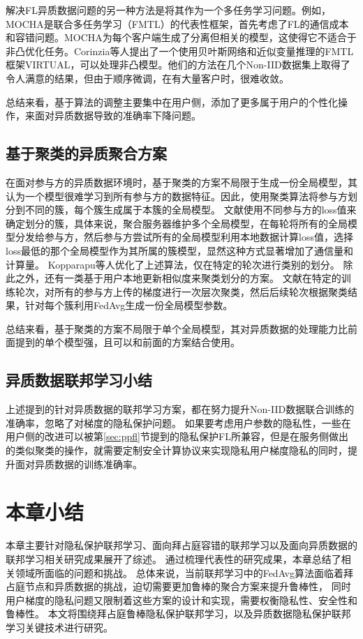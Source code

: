 解决FL异质数据问题的另一种方法是将其作为一个多任务学习问题。例如，MOCHA\cite{smith2017federated}是联合多任务学习（FMTL）的代表性框架，首先考虑了FL的通信成本和容错问题。MOCHA为每个客户端生成了分离但相关的模型，这使得它不适合于非凸优化任务。Corinzia等人\cite{corinzia2019variational}提出了一个使用贝叶斯网络和近似变量推理的FMTL框架VIRTUAL，可以处理非凸模型。他们的方法在几个Non-IID数据集上取得了令人满意的结果，但由于顺序微调，在有大量客户时，很难收敛。


总结来看，基于算法的调整主要集中在用户侧，添加了更多属于用户的个性化操作，来面对异质数据导致的准确率下降问题。

\subsection{基于聚类的异质聚合方案}
在面对参与方的异质数据环境时，基于聚类的方案不局限于生成一份全局模型，其认为一个模型很难学习到所有参与方的数据特征。因此，使用聚类算法将参与方划分到不同的簇，每个簇生成属于本簇的全局模型。
文献\cite{ghosh2022efficient}使用不同参与方的loss值来确定划分的簇，具体来说，聚合服务器维护多个全局模型，在每轮将所有的全局模型分发给参与方，然后参与方尝试所有的全局模型利用本地数据计算loss值，选择loss最低的那个全局模型作为其所属的簇模型，显然这种方式显著增加了通信量和计算量。
Kopparapu等人\cite{kopparapu2020fedfmc}优化了上述算法，仅在特定的轮次进行类别的划分。
除此之外，还有一类基于用户本地更新相似度来聚类划分的方案\cite{briggs2020federated, sattler2020clustered, dempster1977maximum}。
文献\cite{briggs2020federated}在特定的训练轮次，对所有的参与方上传的梯度进行一次层次聚类，然后后续轮次根据聚类结果，针对每个簇利用FedAvg生成一份全局模型参数。

总结来看，基于聚类的方案不局限于单个全局模型，其对异质数据的处理能力比前面提到的单个模型强，且可以和前面的方案结合使用。

\subsection{异质数据联邦学习小结}
上述提到的针对异质数据的联邦学习方案，都在努力提升Non-IID数据联合训练的准确率，忽略了对梯度的隐私保护问题。
如果要考虑用户参数的隐私性，一些在用户侧的改进可以被第\ref{sec:ppfl}节提到的隐私保护FL所兼容，但是在服务侧做出的类似聚类的操作，就需要定制安全计算协议来实现隐私用户梯度隐私的同时，提升面对异质数据的训练准确率。

\section{本章小结}
本章主要针对隐私保护联邦学习、面向拜占庭容错的联邦学习以及面向异质数据的联邦学习相关研究成果展开了综述。
通过梳理代表性的研究成果，本章总结了相关领域所面临的问题和挑战。
总体来说，当前联邦学习中的FedAvg算法面临着拜占庭节点和异质数据的挑战，迫切需要更加鲁棒的聚合方案来提升鲁棒性，
同时用户梯度的隐私问题又限制着这些方案的设计和实现，需要权衡隐私性、安全性和鲁棒性。
本文将围绕拜占庭鲁棒隐私保护联邦学习，以及异质数据隐私保护联邦学习关键技术进行研究。
